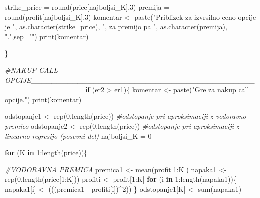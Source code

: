\documentclass[
]{article}
\newenvironment{Shaded}{\begin{snugshade}}{\end{snugshade}}
\newcommand{\AttributeTok}[1]{\textcolor[rgb]{0.77,0.63,0.00}{#1}}
\newcommand{\CommentTok}[1]{\textcolor[rgb]{0.56,0.35,0.01}{\textit{#1}}}
\newcommand{\ControlFlowTok}[1]{\textcolor[rgb]{0.13,0.29,0.53}{\textbf{#1}}}
\newcommand{\DecValTok}[1]{\textcolor[rgb]{0.00,0.00,0.81}{#1}}
\newcommand{\FunctionTok}[1]{\textcolor[rgb]{0.00,0.00,0.00}{#1}}
\newcommand{\NormalTok}[1]{#1}
\newcommand{\OtherTok}[1]{\textcolor[rgb]{0.56,0.35,0.01}{#1}}
\newcommand{\SpecialCharTok}[1]{\textcolor[rgb]{0.00,0.00,0.00}{#1}}
\newcommand{\StringTok}[1]{\textcolor[rgb]{0.31,0.60,0.02}{#1}}
\begin{document}
\begin{Shaded}
\begin{Highlighting}[]
\NormalTok{      strike\_price }\OtherTok{=} \FunctionTok{round}\NormalTok{(price[najboljsi\_K],}\DecValTok{3}\NormalTok{)}
\NormalTok{      premija }\OtherTok{=} \FunctionTok{round}\NormalTok{(profit[najboljsi\_K],}\DecValTok{3}\NormalTok{)}
\NormalTok{      komentar }\OtherTok{\textless{}{-}} \FunctionTok{paste}\NormalTok{(}\StringTok{"Priblizek za izvrsilno ceno opcije je "}\NormalTok{, }\FunctionTok{as.character}\NormalTok{(strike\_price), }\StringTok{", za premijo pa "}\NormalTok{, }\FunctionTok{as.character}\NormalTok{(premija), }\StringTok{"."}\NormalTok{,}\AttributeTok{sep=}\StringTok{""}\NormalTok{)}
      \FunctionTok{print}\NormalTok{(komentar)}
      
\NormalTok{    \}}
    
    \CommentTok{\#NAKUP CALL OPCIJE\_\_\_\_\_\_\_\_\_\_\_\_\_\_\_\_\_\_\_\_\_\_\_\_\_\_\_\_\_\_\_\_\_\_\_\_\_\_\_\_\_\_\_\_\_\_\_\_\_\_\_\_\_\_\_\_\_\_}
    \ControlFlowTok{if}\NormalTok{ (er2 }\SpecialCharTok{\textgreater{}}\NormalTok{ er1)\{}
\NormalTok{      komentar }\OtherTok{\textless{}{-}} \FunctionTok{paste}\NormalTok{(}\StringTok{"Gre za nakup call opcije."}\NormalTok{)}
      \FunctionTok{print}\NormalTok{(komentar)}
      
\NormalTok{      odstopanje1 }\OtherTok{\textless{}{-}} \FunctionTok{rep}\NormalTok{(}\DecValTok{0}\NormalTok{,}\FunctionTok{length}\NormalTok{(price)) }\CommentTok{\#odstopanje pri aproksimaciji z vodoravno premico}
\NormalTok{      odstopanje2 }\OtherTok{\textless{}{-}} \FunctionTok{rep}\NormalTok{(}\DecValTok{0}\NormalTok{,}\FunctionTok{length}\NormalTok{(price)) }\CommentTok{\#odstopanje pri aproksimaciji z linearno regresijo (posevni del)}
\NormalTok{      najboljsi\_K }\OtherTok{=} \DecValTok{0}
      
      \ControlFlowTok{for}\NormalTok{ (K }\ControlFlowTok{in} \DecValTok{1}\SpecialCharTok{:}\FunctionTok{length}\NormalTok{(price))\{}
        
        \CommentTok{\#VODORAVNA PREMICA}
\NormalTok{        premica1 }\OtherTok{\textless{}{-}} \FunctionTok{mean}\NormalTok{(profit[}\DecValTok{1}\SpecialCharTok{:}\NormalTok{K])}
\NormalTok{        napaka1 }\OtherTok{\textless{}{-}} \FunctionTok{rep}\NormalTok{(}\DecValTok{0}\NormalTok{,}\FunctionTok{length}\NormalTok{(price[}\DecValTok{1}\SpecialCharTok{:}\NormalTok{K]))}
\NormalTok{        profiti }\OtherTok{\textless{}{-}}\NormalTok{ profit[}\DecValTok{1}\SpecialCharTok{:}\NormalTok{K]}
        \ControlFlowTok{for}\NormalTok{ (i }\ControlFlowTok{in} \DecValTok{1}\SpecialCharTok{:}\FunctionTok{length}\NormalTok{(napaka1))\{}
\NormalTok{          napaka1[i] }\OtherTok{\textless{}{-}}\NormalTok{ (((premica1 }\SpecialCharTok{{-}}\NormalTok{ profiti[i])}\SpecialCharTok{\^{}}\DecValTok{2}\NormalTok{))}
\NormalTok{        \}}
\NormalTok{        odstopanje1[K] }\OtherTok{\textless{}{-}} \FunctionTok{sum}\NormalTok{(napaka1)}
        

\end{Highlighting}
\end{Shaded}
\end{document}
